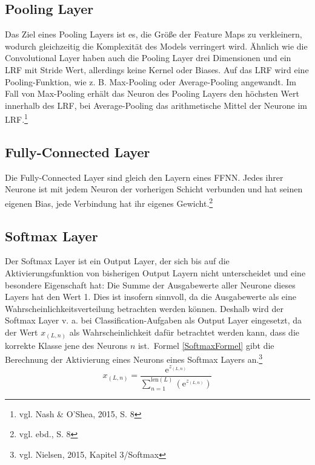 \documentclass[a4paper,12pt,ngerman,oneside]{scrreprt}	%
\newcommand{\cnnKlein}[1]{vgl. Nash \& O'Shea, 2015, S. {#1}}
\newcommand{\ebd}[1]{vgl. ebd., S. {#1}}
\begin{document}
			\subsection{Pooling Layer}
			Das Ziel eines Pooling Layers ist es, die Größe der Feature Maps zu verkleinern, wodurch gleichzeitig die Komplexität des Models verringert wird. Ähnlich wie die Convolutional Layer haben auch die Pooling Layer drei Dimensionen und ein LRF mit Stride Wert, allerdings keine Kernel oder Biases. Auf das LRF wird eine Pooling-Funktion, wie z. B. Max-Pooling oder Average-Pooling angewandt. Im Fall von Max-Pooling erhält das Neuron des Pooling Layers den höchsten Wert innerhalb des LRF, bei Average-Pooling das arithmetische Mittel der Neurone im LRF.\footnote{\cnnKlein{8}}
			\subsection{Fully-Connected Layer}
			Die Fully-Connected Layer sind gleich den Layern eines FFNN. Jedes ihrer Neurone ist mit jedem Neuron der vorherigen Schicht verbunden und hat seinen eigenen Bias, jede Verbindung hat ihr eigenes Gewicht.\footnote{\ebd{8}}
			\subsection{Softmax Layer}
			Der Softmax Layer ist ein Output Layer, der sich bis auf die Aktivierungsfunktion von bisherigen Output Layern nicht unterscheidet und eine besondere Eigenschaft hat: Die Summe der Ausgabewerte aller Neurone dieses Layers hat den Wert 1. Dies ist insofern sinnvoll, da die Ausgabewerte als eine Wahrscheinlichkeitsverteilung betrachten werden können. Deshalb wird der Softmax Layer v. a. bei Classification-Aufgaben als Output Layer eingesetzt, da der Wert $x_{(L,n)}$ als Wahrscheinlichkeit dafür betrachtet werden kann, dass die korrekte Klasse jene des Neurons $n$ ist.~Formel \ref{SoftmaxFormel} gibt die Berechnung der Aktivierung eines Neurons eines Softmax Layers an.\footnote{vgl. Nielsen, 2015, Kapitel 3/Softmax}
			\vspace*{-0.3cm}
			\begin{equation}\label{SoftmaxFormel}
				x_{(L,n)} = \frac{ \textrm{e}^{ z_{(L,n)} } }{ \sum\limits_{ n=1 }^{ \textrm{len}(L) } \left( \textrm{e}^{ z_{ (L,n) } } \right)} 
			\end{equation}
			
\end{document}
